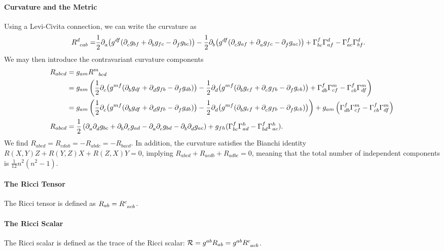 \paragraph{Curvature and the Metric}
Using a Levi-Civita connection, we can write the curvature as
\begin{align*}
	\tensor{R}{^{d}_{cab}} =& \frac{1}{2}\del{}{a}{\left(g^{df}(\del{}{c}{g_{bf}} + \del{}{b}{g_{fc}} - \del{}{f}{g_{bc}})\right)} - \frac{1}{2}\del{}{b}{\left(g^{df}(\del{}{c}{g_{af}} + \del{}{a}{g_{fc}} - \del{}{f}{g_{ac}})\right)} + \chris{f}{b}{c}\chris{d}{a}{f} - \chris{f}{a}{c}\chris{d}{b}{f}.
\end{align*}
We may then introduce the contravariant curvature components
\begin{align*}
	R_{abcd} &= g_{am}\tensor{R}{^{m}_{bcd}} \\
	         &= g_{am}\left(\frac{1}{2}\del{}{c}{\left(g^{mf}(\del{}{b}{g_{df}} + \del{}{d}{g_{fb}} - \del{}{f}{g_{db}})\right)} - \frac{1}{2}\del{}{d}{\left(g^{mf}(\del{}{b}{g_{cf}} + \del{}{c}{g_{fb}} - \del{}{f}{g_{cb}})\right)} + \chris{f}{d}{b}\chris{m}{c}{f} - \chris{f}{c}{b}\chris{m}{d}{f}\right) \\
	         &= g_{am}\left(\frac{1}{2}\del{}{c}{\left(g^{mf}(\del{}{b}{g_{df}} + \del{}{d}{g_{fb}} - \del{}{f}{g_{db}})\right)} - \frac{1}{2}\del{}{d}{\left(g^{mf}(\del{}{b}{g_{cf}} + \del{}{c}{g_{fb}} - \del{}{f}{g_{cb}})\right)}\right) + g_{am}\left(\chris{f}{d}{b}\chris{m}{c}{f} - \chris{f}{c}{b}\chris{m}{d}{f}\right) \\
	R_{abcd} &= \frac{1}{2}\left(\del{}{a}{\del{}{d}{g_{bc}}} + \del{}{b}{\del{}{c}{g_{ad}}} - \del{}{a}{\del{}{c}{g_{bd}}} - \del{}{b}{\del{}{d}{g_{ac}}}\right) + g_{fh}(\chris{f}{b}{c}\chris{h}{a}{d} - \chris{f}{b}{d}\chris{h}{a}{c}).
\end{align*}
We find $R_{abcd} = R_{cdab} = -R_{abdc} = -R_{bacd}$. In addition, the curvature satisfies the Bianchi identity $R(X, Y)Z + R(Y, Z)X + R(Z, X)Y = 0$, implying $R_{abcd} + R_{acdb} + R_{adbc} = 0$, meaning that the total number of independent components is $\frac{1}{12}n^{2}(n^{2} - 1)$.

\paragraph{The Ricci Tensor}
The Ricci tensor is defined as $R_{ab} = \tensor{R}{^{c}_{acb}}$.

\paragraph{The Ricci Scalar}
The Ricci scalar is defined as the trace of the Ricci scalar: $\mathcal{R} = g^{ab}R_{ab} = g^{ab}\tensor{R}{^{c}_{acb}}$.

